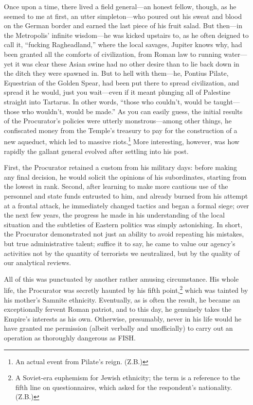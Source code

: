Once upon a time, there lived a field general---an honest fellow, though, as he seemed to me at first, an utter simpleton---who poured out his sweat and blood on the German border and earned the last piece of his fruit salad. But then---in the Metropolis' infinite wisdom---he was kicked upstairs to, as he often deigned to call it, ``fucking Ragheadland,'' where the local savages, Jupiter knows why, had been granted all the comforts of civilization, from Roman law to running water---yet it was clear these Asian swine had no other desire than to lie back down in the ditch they were spawned in. But to hell with them---he, Pontius Pilate, Equestrian of the Golden Spear, had been put there to spread civilization, and spread it he would, just you wait---even if it meant plunging all of Palestine straight into Tartarus. In other words, ``those who couldn't, would be taught---those who wouldn't, would be made.'' As you can easily guess, the initial results of the Procurator's policies were utterly monstrous---among other things, he confiscated money from the Temple's treasury to pay for the construction of a new aqueduct, which led to massive riots.\footnote{An actual event from Pilate's reign. (Z.B.)} More interesting, however, was how rapidly the gallant general evolved after settling into his post.

First, the Procurator retained a custom from his military days: before making any final decision, he would solicit the opinions of his subordinates, starting from the lowest in rank. Second, after learning to make more cautious use of the personnel and state funds entrusted to him, and already burned from his attempt at a frontal attack, he immediately changed tactics and began a formal siege; over the next few years, the progress he made in his understanding of the local situation and the subtleties of Eastern politics was simply astonishing. In short, the Procurator demonstrated not just an ability to avoid repeating his mistakes, but true administrative talent; suffice it to say, he came to value our agency's activities not by the quantity of terrorists we neutralized, but by the quality of our analytical reviews.

All of this was punctuated by another rather amusing circumstance. His whole life, the Procurator was secretly haunted by his fifth point,\footnote{A Soviet-era euphemism for Jewish ethnicity; the term is a reference to the fifth line on questionnaires, which asked for the respondent's nationality. (Z.B.)} which was tainted by his mother's Samnite ethnicity. Eventually, as is often the result, he became an exceptionally fervent Roman patriot, and to this day, he genuinely takes the Empire's interests as his own. Otherwise, presumably, never in his life would he have granted me permission (albeit verbally and unofficially) to carry out an operation as thoroughly dangerous as FISH.

